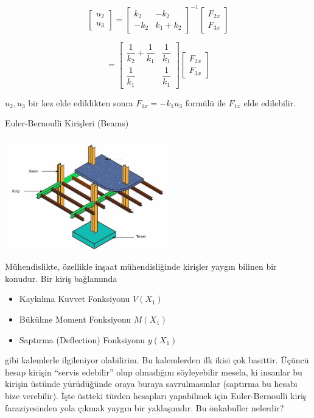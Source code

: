 \documentclass[12pt,fleqn]{article}\usepackage{../../common}
\begin{document}
$$
\left[\begin{array}{ccc}
u_2 \\ u_3
\end{array}\right] =
\left[\begin{array}{cc}
k_2 & -k_2 \\ -k_2 & k_1 + k_2 
\end{array}\right]^{-1}
\left[\begin{array}{c}
F_{2x} \\ F_{3x}
\end{array}\right]
$$

$$
= \left[\begin{array}{cc}
\dfrac{1}{k_2} + \dfrac{1}{k_1} & \dfrac{1}{k_1} \\
\dfrac{1}{k_1} & \dfrac{1}{k_1} 
\end{array}\right]
\left[\begin{array}{c}
F_{2x} \\ F_{3x}
\end{array}\right]
$$

$u_2,u_3$ bir kez elde edildikten sonra $F_{1x} = -k_1 u_3$ formülü
ile $F_{1x}$ elde edilebilir.

Euler-Bernoulli Kirişleri (Beams)

\includegraphics[width=20em]{phy_020_strs_02_09.jpg}

Mühendislikte, özellikle inşaat mühendisliğinde kirişler yaygın bilinen
bir konudur. Bir kiriş bağlamında

\begin{itemize}
   \item Kaykılma Kuvvet Fonksiyonu $V(X_1)$
   \item Bükülme Moment Fonksiyonu $M(X_1)$
   \item Saptırma (Deflection) Fonksiyonu $y(X_1)$
\end{itemize}

gibi kalemlerle ilgileniyor olabilirim. Bu kalemlerden ilk ikisi çok basittir.
Üçüncü hesap kirişin ``servis edebilir'' olup olmadığını söyleyebilir mesela, ki
insanlar bu kirişin üstünde yürüdüğünde oraya buraya savrulmasınlar (saptırma bu
hesabı bize verebilir). İşte üstteki türden hesapları yapabilmek için
Euler-Bernoulli kiriş faraziyesinden yola çıkmak yaygın bir yaklaşımdır.  Bu
önkabuller nelerdir?
\end{document}
